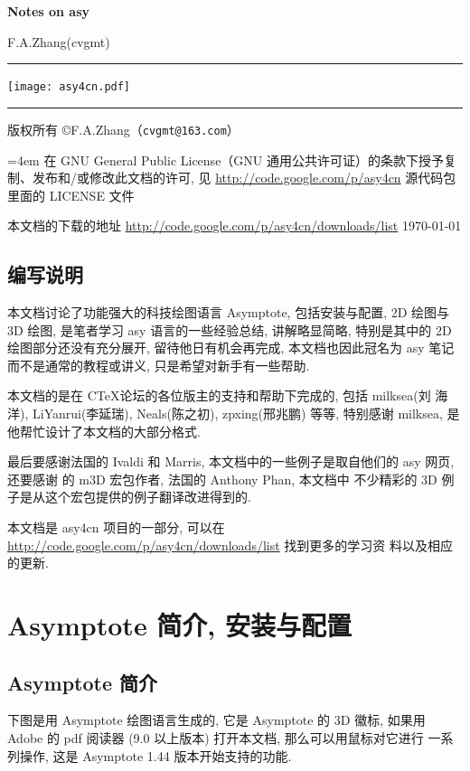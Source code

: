 \documentclass[nofonts,CJKnormalspaces]{ctexbook}
\newcommand*\prgname[1]{\textsf{#1}}
\begin{document}
\frontmatter

\begin{titlepage}
  \setlength{\parindent}{0pt}

  \centerline{\Huge\bfseries\prgname{Notes on asy}}
  \hfill F.A.Zhang(cvgmt)
  \rule[0pt]{\textwidth}{4pt}

  \centerline{\texttt{[image: asy4cn.pdf]}}

  \rule[0pt]{\textwidth}{2pt}

  版权所有 \copyright{}F.A.Zhang（\nolinkurl{cvgmt@163.com}）

  {\leftskip=4em
    在 GNU General Public License（GNU 通用公共许可证）的条款下授予复
    制、发布和/或修改此文档的许可, 见
    \url{http://code.google.com/p/asy4cn} 源代码包里面的
    LICENSE 文件 \par}
  本文档的下载的地址 \url{http://code.google.com/p/asy4cn/downloads/list}
  \qquad\today
\end{titlepage}

\section*{编写说明}
本文档讨论了功能强大的科技绘图语言 Asymptote, 包括安装与配置, 2D 绘图与
3D 绘图, 是笔者学习 asy 语言的一些经验总结, 讲解略显简略, 特别是其中的
2D 绘图部分还没有充分展开, 留待他日有机会再完成, 本文档也因此冠名为 asy
笔记而不是通常的教程或讲义, 只是希望对新手有一些帮助.

本文档的是在 C\TeX 论坛的各位版主的支持和帮助下完成的, 包括 milksea(刘
海洋), LiYanrui(李延瑞), Neals(陈之初), zpxing(邢兆鹏) 等等, 特别感谢
milksea, 是他帮忙设计了本文档的大部分格式.

最后要感谢法国的 Ivaldi 和 Marris, 本文档中的一些例子是取自他们的 asy
网页, 还要感谢 \MP{} 的 m3D 宏包作者, 法国的 Anthony Phan, 本文档中
不少精彩的 3D 例子是从这个宏包提供的例子翻译改进得到的.

本文档是 asy4cn 项目的一部分, 可以在
\url{http://code.google.com/p/asy4cn/downloads/list} 找到更多的学习资
料以及相应的更新.

\tableofcontents

\mainmatter

\chapter{Asymptote 简介, 安装与配置}
\section{Asymptote 简介}
下图是用 Asymptote 绘图语言生成的, 它是 Asymptote 的 3D 徽标, 如果用
Adobe 的 pdf 阅读器 (9.0 以上版本) 打开本文档, 那么可以用鼠标对它进行
一系列操作, 这是 Asymptote 1.44 版本开始支持的功能.
\end{document}
